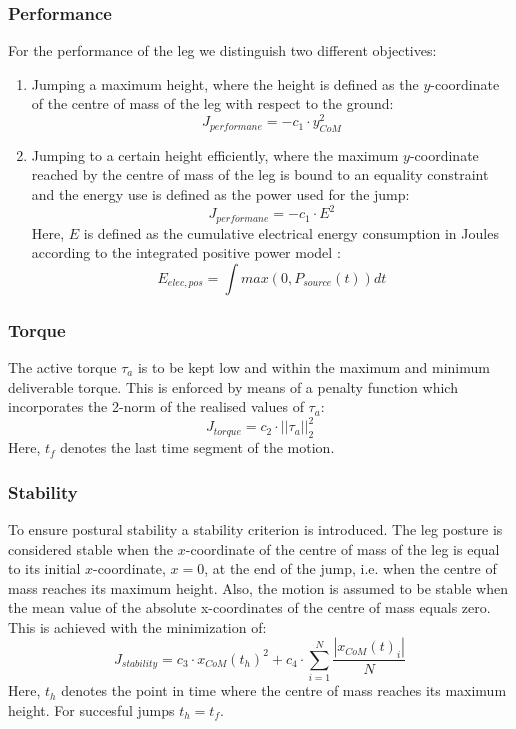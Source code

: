\documentclass[letterpaper, 10 pt, conference]{ieeeconf}  %
\begin{document}
\subsubsection{Performance}
For the performance of the leg we distinguish two different objectives: 
\begin{enumerate}
	\item Jumping a maximum height, where the height is defined as the $y$-coordinate of the centre of mass of the leg with respect to the ground:
 \begin{equation}
	J_{performane} = -c_1 \cdot y_{CoM}^2
 \end{equation}
	\item Jumping to a certain height efficiently, where the maximum $y$-coordinate reached by the centre of mass of the leg is bound to an equality constraint and the energy use is defined as the power used for the jump:
 \begin{equation}
	J_{performane} = - c_1 \cdot E^2
 \end{equation}
	Here, $E$ is defined as the cumulative electrical energy consumption in Joules according to the integrated positive power model \cite{verstraten2016energy}:
	 \begin{equation}
	E_{elec,pos} = \int max(0,P_{source}(t))dt
	\end{equation}
\end{enumerate}

\subsubsection{Torque}
The active torque $\tau_a$ is to be kept low and within the maximum and minimum deliverable torque. This is enforced by means of a penalty function which incorporates the 2-norm of the realised values of $\tau_a$:  
 \begin{equation}
J_{torque}= c_2 \cdot || \tau_a ||_2^2
 \end{equation}
Here, $t_f$ denotes the last time segment of the motion.\\

\subsubsection{Stability}
To ensure postural stability a stability criterion is introduced. The leg posture is considered stable when the $x$-coordinate of the centre of mass of the leg is equal to its initial $x$-coordinate, $x=0$, at the end of the jump, i.e. when the centre of mass reaches its maximum height. Also, the motion is assumed to be stable when the mean value of the absolute x-coordinates of the centre of mass equals zero. This is achieved with the minimization of:
 \begin{equation}
J_{stability}  = c_3\cdot x_{CoM}(t_h)^2 + c_4\cdot  \sum^{N}_{i=1}\frac{| x_{CoM}(t)_i |}{N}
 \end{equation}
Here, $t_h$ denotes the point in time where the centre of mass reaches its maximum height. For succesful jumps $t_h=t_f$.\\
\end{document}
